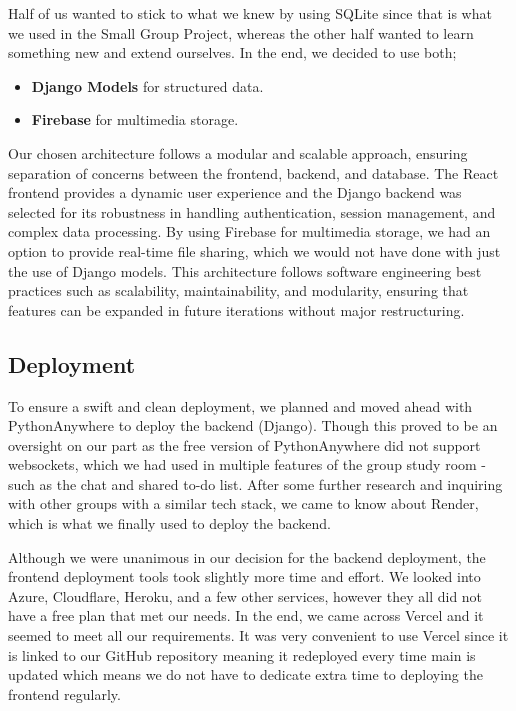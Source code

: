 Half of us wanted to stick to what we knew by using SQLite since that is what we used in the Small Group Project, whereas the other half wanted to learn something new and extend ourselves. In the end, we decided to use both; \begin{itemize}
    \item \textbf{Django Models} for structured data.
    \item \textbf{Firebase} for multimedia storage.
\end{itemize}

Our chosen architecture follows a modular and scalable approach, ensuring separation of concerns between the frontend, backend, and database. The React frontend provides a dynamic user experience and the Django backend was selected for its robustness in handling authentication, session management, and complex data processing. By using Firebase for multimedia storage, we had an option to provide real-time file sharing, which we would not have done with just the use of Django models. This architecture follows software engineering best practices such as scalability, maintainability, and modularity, ensuring that features can be expanded in future iterations without major restructuring.


\subsection{Deployment}
To ensure a swift and clean deployment, we planned and moved ahead with PythonAnywhere to deploy the backend (Django). Though this proved to be an oversight on our part as the free version of PythonAnywhere did not support websockets, which we had used in multiple features of the group study room - such as the chat and shared to-do list. After some further research and inquiring with other groups with a similar tech stack, we came to know about Render, which is what we finally used to deploy the backend.

Although we were unanimous in our decision for the backend deployment, the frontend deployment tools took slightly more time and effort. We looked into Azure, Cloudflare, Heroku, and a few other services, however they all did not have a free plan that met our needs. In the end, we came across Vercel and it seemed to meet all our requirements. It was very convenient to use Vercel since it is linked to our GitHub repository meaning it redeployed every time main is updated which means we do not have to dedicate extra time to deploying the frontend regularly.

